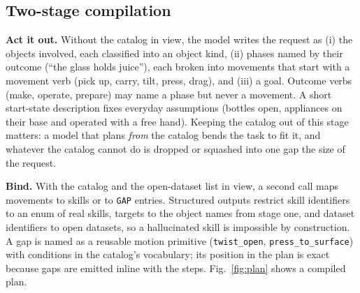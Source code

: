 \documentclass[10pt,twocolumn,letterpaper]{article}
\newcommand{\code}[1]{\texttt{\small #1}}
\begin{document}
\subsection{Two-stage compilation}\label{sec:compile}
\textbf{Act it out.} Without the catalog in view, the model writes the request as (i) the objects involved, each
classified into an object kind, (ii) phases named by their outcome (``the glass holds juice''), each broken into
movements that start with a movement verb (pick up, carry, tilt, press, drag), and (iii) a goal. Outcome verbs
(make, operate, prepare) may name a phase but never a movement. A short start-state description fixes everyday
assumptions (bottles open, appliances on their base and operated with a free hand). Keeping the catalog out of this
stage matters: a model that plans \emph{from} the catalog bends the task to fit it, and whatever the catalog cannot do
is dropped or squashed into one gap the size of the request.

\textbf{Bind.} With the catalog and the open-dataset list in view, a second call maps movements to skills or to
\code{GAP} entries. Structured outputs restrict skill identifiers to an enum of real skills, targets to the object
names from stage one, and dataset identifiers to open datasets, so a hallucinated skill is impossible by
construction. A gap is named as a reusable motion primitive (\code{twist\_open}, \code{press\_to\_surface}) with
conditions in the catalog's vocabulary; its position in the plan is exact because gaps are emitted inline with the
steps. Fig.~\ref{fig:plan} shows a compiled plan.
\end{document}
